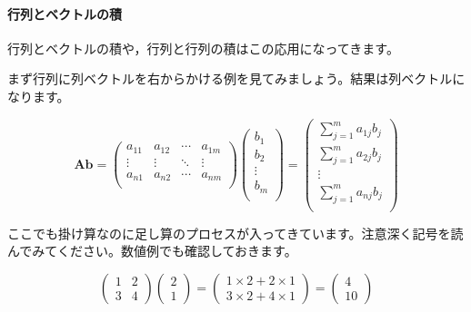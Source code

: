 \documentclass{ltjsbook}
\begin{document}
\paragraph{行列とベクトルの積}

行列とベクトルの積や，行列と行列の積はこの応用になってきます。

まず行列に列ベクトルを右からかける例を見てみましょう。結果は列ベクトルになります。

\begin{equation*}
	\bm{A} \bm{b} =
	\begin{pmatrix}
		a_{11} & a_{12} & \cdots & a_{1m} \\
		\vdots & \vdots & \ddots & \vdots \\
		a_{n1} & a_{n2} & \cdots & a_{nm} \\
	\end{pmatrix}
	\begin{pmatrix}
		b_1    \\
		b_2    \\
		\vdots \\
		b_m    \\
	\end{pmatrix}
	=
	\begin{pmatrix}
		\sum_{j=1}^{m} a_{1j}b_{j} \\
		\sum_{j=1}^{m} a_{2j}b_{j} \\
		\vdots                     \\
		\sum_{j=1}^{m} a_{nj}b_{j} \\
	\end{pmatrix}
\end{equation*}


ここでも掛け算なのに足し算のプロセスが入ってきています。注意深く記号を読んでみてください。数値例でも確認しておきます。

\begin{equation*}
	\begin{pmatrix}
		1 & 2 \\ 3 & 4
	\end{pmatrix}
	\begin{pmatrix}
		2 \\1
	\end{pmatrix}
	=
	\begin{pmatrix}
		1 \times 2 + 2 \times 1 \\
		3 \times 2 + 4 \times 1
	\end{pmatrix}
	=
	\begin{pmatrix}
		4 \\10
	\end{pmatrix}
\end{equation*}
\end{document}
